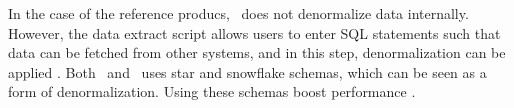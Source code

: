 In the case of the reference producs, \qlikview~does not denormalize data internally. However, the data extract script allows users to enter SQL statements such that data can be fetched from other systems, and in this step, denormalization can be applied \cite{Qlik2011-yc}. Both \qlikview~and \tableau~uses star and snowflake schemas, which can be seen as a form of denormalization. Using these schemas boost performance \cite{Kamkolkar2015-iq}.



